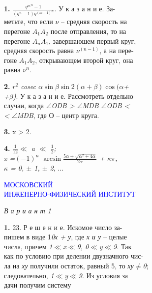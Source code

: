 \begin{minipage}[b]{0.60\textwidth}
	\hphantom\qquad\qquad \qquad\quad \textbf{1.}  $\frac{{q^m}^n - 1}{(q^n - 1) {q^(m-1)}^n}$.  У к а з  а н и е. За-\\
	\hphantom\qquad\qquad метьте, что если \textit{$\nu$} -- средняя скорость на\\
	\hphantom\qquad\qquad перегоне \textit{$A_1$$A_2$} после отправления, то на\\
	\hphantom\qquad\qquad перегоне \textit{$A_n$$A_1$}, завершаюшем первый круг,\\
	\hphantom\qquad\qquad средняя скорость равна \textit{$\nu^{(n-1)}$},  а на пере-\\
	\hphantom\qquad\qquad гоне  \textit{$A_1$$A_2$}, открывающем второй круг, она\\
	\hphantom\qquad\qquad равна  \textit{$\nu^n$}.

	\hphantom\qquad\qquad \qquad\quad \textbf{2.} \textit{ $r^2$ cosec $\alpha \sin{\beta} \sin2(\alpha+\beta)\cos(\alpha$+\\
	\hphantom\qquad\qquad +$\beta$)}. У к а  з а н и е. Рассмотреть отдельно \\
	\hphantom\qquad\qquad случаи, когда \textit{$\angle$ODB > $\angle$MDB $\angle$ODB <\\
	\hphantom\qquad\qquad < $\angle$MDB},  где О -- центр круга.

	\hphantom\qquad\qquad \qquad\quad \textbf{3.} x > 2.

	\hphantom\qquad\qquad \qquad \textbf{4.} \textit{$\frac{1}{12}$$\ll$ a $\ll$ $\frac{1}{2}$;\\
	\hphantom\qquad\qquad \quad x =$(-1)^n$ $\arcsin\frac{5\alpha\pm\sqrt{\alpha^2 + 4\alpha}}{2\alpha}$ + $\kappa\pi$,\\
	\hphantom\qquad\qquad \qquad \qquad $\kappa$ = 0, $\pm$ 1, $\pm$ 2}, ...

	\begin{center}
		\textcolor{blue}{ МОСКОВСКИЙ\\
		ИНЖЕНЕРНО-ФИЗИЧЕСКИЙ ИНСТИТУТ}
	\end{center}
	
	\begin{center}
		 \textit{ В а р и а н т 1}
	\end{center}

	\hphantom\qquad\qquad \qquad \textbf{1.} 23. Р е ш е н и е. Искомое число за-\\
	\hphantom\qquad\qquad пишем в виде 1\textit{0х + у}, где \textit{х и у} -- целые\\
	\hphantom\qquad\qquad числа, причем \textit{1$\ll$x$\ll$9, 0$\ll$y$\ll$9}. Так\\
	\hphantom\qquad\qquad как по условию при делении двузначного чис-\\
	\hphantom\qquad\qquad ла на \textit{ху} получили остаток, равный 5, то \textit{ху$\neq$0};\\
	\hphantom\qquad\qquad следовательно, \textit{1$\ll$y$\ll$9}. Из условия за\\
	\hphantom\qquad\qquad дачи получим систему


\end{minipage}
